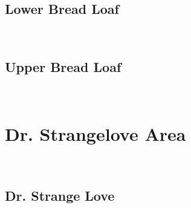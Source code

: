 \subsection*{Lower Bread Loaf}\label{bf:Lower Bread Loaf}
\

\subsection*{Upper Bread Loaf}\label{bf:Upper Bread Loaf}
\

\section{Dr. Strangelove Area}\label{sa:Dr. Strangelove Area}
\
\subsection*{Dr. Strange Love}\label{bf:Dr. Strange Love}
\

\clearpage